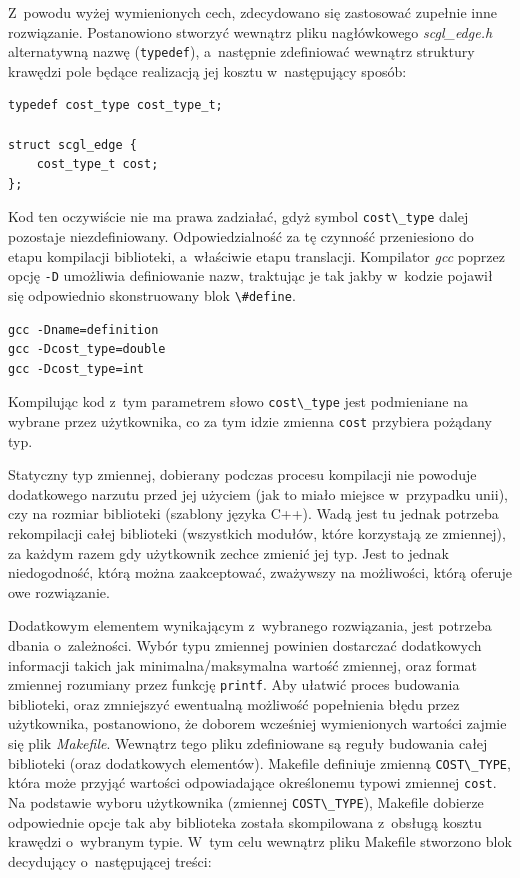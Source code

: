 \documentclass[a4paper,12pt,polish,twoside,openright]{thesis}
\newcommand\code[1]{\lstinline[style=line]{#1}}
\begin{document}
Z~powodu wyżej wymienionych cech, zdecydowano się zastosować zupełnie inne rozwiązanie.
Postanowiono stworzyć wewnątrz pliku nagłówkowego \emph{scgl\_edge.h} alternatywną nazwę (\code{typedef}), a~następnie zdefiniować wewnątrz struktury krawędzi pole będące realizacją jej kosztu w~następujący sposób:
\begin{lstlisting}[style=code,caption=Koszt krawędzi w~bibliotece SCGL]
typedef cost_type cost_type_t;

struct scgl_edge {
	cost_type_t cost;
};
\end{lstlisting}
Kod ten oczywiście nie ma prawa zadziałać, gdyż symbol \code{cost\_type} dalej pozostaje niezdefiniowany.
Odpowiedzialność za tę czynność przeniesiono do etapu kompilacji biblioteki, a~właściwie etapu translacji.
Kompilator \emph{gcc} poprzez opcję \code{-D} umożliwia definiowanie nazw, traktując je tak jakby w~kodzie pojawił się odpowiednio skonstruowany blok \code{\#define}.
\begin{lstlisting}[style=coden]
gcc -Dname=definition
gcc -Dcost_type=double
gcc -Dcost_type=int
\end{lstlisting}
Kompilując kod z~tym parametrem słowo \code{cost\_type} jest podmieniane na wybrane przez użytkownika, co za tym idzie zmienna \code{cost} przybiera pożądany typ.

Statyczny typ zmiennej, dobierany podczas procesu kompilacji nie powoduje dodatkowego narzutu przed jej użyciem (jak to miało miejsce w~przypadku unii), czy na rozmiar biblioteki (szablony języka C++).
Wadą jest tu jednak potrzeba rekompilacji całej biblioteki (wszystkich modułów, które korzystają ze zmiennej), za każdym razem gdy użytkownik zechce zmienić jej typ.
Jest to jednak niedogodność, którą można zaakceptować, zważywszy na możliwości, którą oferuje owe rozwiązanie.

Dodatkowym elementem wynikającym z~wybranego rozwiązania, jest potrzeba dbania o~zależności.
Wybór typu zmiennej powinien dostarczać dodatkowych informacji takich jak minimalna/maksymalna wartość zmiennej, oraz format zmiennej rozumiany przez funkcję \code{printf}.
Aby ułatwić proces budowania biblioteki, oraz zmniejszyć ewentualną możliwość popełnienia błędu przez użytkownika, postanowiono, że doborem wcześniej wymienionych wartości zajmie się plik \emph{Makefile}.
Wewnątrz tego pliku zdefiniowane są reguły budowania całej biblioteki (oraz dodatkowych elementów).
Makefile definiuje zmienną \code{COST\_TYPE}, która może przyjąć wartości odpowiadające określonemu typowi zmiennej \code{cost}.
Na podstawie wyboru użytkownika (zmiennej \code{COST\_TYPE}), Makefile dobierze odpowiednie opcje tak aby biblioteka została skompilowana z~obsługą kosztu krawędzi o~wybranym typie.
W~tym celu wewnątrz pliku Makefile stworzono blok decydujący o~następującej treści:
\end{document}
